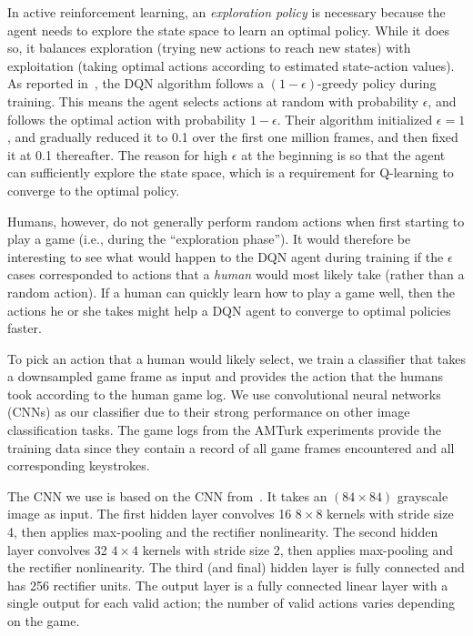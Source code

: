 \documentclass[letterpaper, 10 pt, conference]{ieeeconf}  %
\begin{document}
In active reinforcement learning, an \emph{exploration policy} is necessary because the agent needs
to explore the state space to learn an optimal policy. While it does so, it balances exploration
(trying new actions to reach new states) with exploitation (taking optimal actions according to
estimated state-action values). As reported in~\cite{mnih-dqn-2015}, the DQN algorithm follows a
$(1-\epsilon)$-greedy policy during training. This means the agent selects actions at random with
probability $\epsilon$, and follows the optimal action with probability $1-\epsilon$. Their
algorithm initialized $\epsilon=1$, and gradually reduced it to 0.1 over the first one million
frames, and then fixed it at 0.1 thereafter. The reason for high $\epsilon$ at the beginning is so
that the agent can sufficiently explore the state space, which is a requirement for Q-learning to
converge to the optimal policy.

Humans, however, do not generally perform random actions when first starting to play a game (i.e.,
during the ``exploration phase''). It would therefore be interesting to see what would happen to the
DQN agent during training if the $\epsilon$ cases corresponded to actions that a \emph{human} would
most likely take (rather than a random action). If a human can quickly learn how to play a game
well, then the actions he or she takes might help a DQN agent to converge to optimal policies
faster.

To pick an action that a human would likely select, we train a classifier that takes a downsampled
game frame as input and provides the action that the humans took according to the human game log.
We use convolutional neural networks (CNNs) as our classifier due to their strong performance on
other image classification tasks.  The game logs from the AMTurk experiments provide the training
data since they contain a record of all game frames encountered and all corresponding keystrokes.

The CNN we use is based on the CNN from~\cite{mnih-atari-2013}. It takes an $(84\times 84)$
grayscale image as input. The first hidden layer convolves 16 $8\times 8$ kernels with stride size
4, then applies max-pooling and the rectifier nonlinearity. The second hidden layer convolves 32
$4\times 4$ kernels with stride size 2, then applies max-pooling and the rectifier nonlinearity. The
third (and final) hidden layer is fully connected and has 256 rectifier units. The output layer is a
fully connected linear layer with a single output for each valid action; the number of valid actions
varies depending on the game.
\end{document}
